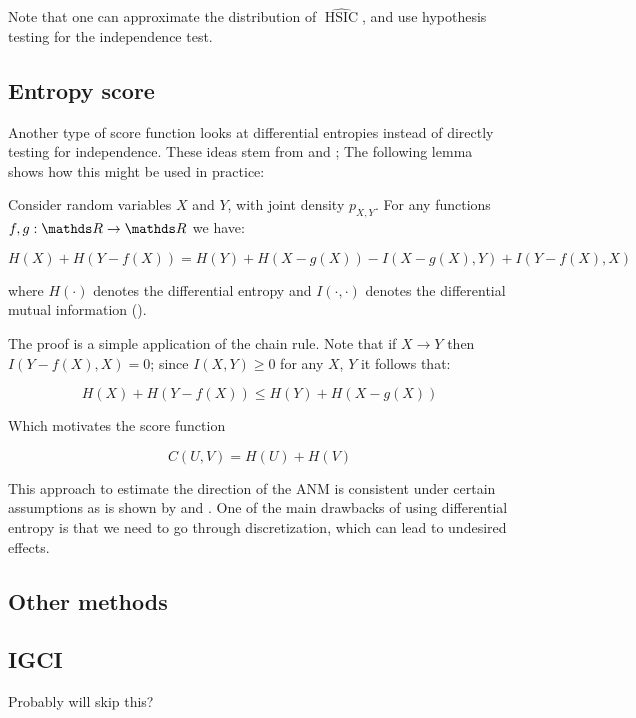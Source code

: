 Note that one can approximate the distribution of $\widehat{\operatorname{HSIC}}$, and use hypothesis testing 
for the independence test. 

\subsection{Entropy score}

Another type of score function looks at differential entropies instead of directly testing for independence.
These ideas stem from \cite{kpotufe2014consistency} and \cite{nowzohour2016score}; The following lemma shows how this might be used in practice:

\begin{lemma} Consider random variables $X$ and $Y$, with joint density $p_{X, Y}$. For any functions 
$f, g : \R \rightarrow \R$ we have:

$$
    H(X) + H(Y - f(X)) = H(Y) + H(X - g(X)) - I(X - g(X), Y) + I(Y - f(X), X)
$$

where $H(\cdot)$ denotes the differential entropy and $I(\cdot, \cdot)$ denotes the differential mutual information 
(\cite{cover1999elements}).
\end{lemma}

The proof is a simple application of the chain rule. Note that if $X \rightarrow Y$ then $I(Y - f(X), X) = 0$; 
since $I(X, Y) \geq 0$ for any $X$, $Y$ it follows
that:

$$
    H(X) + H(Y - f(X)) \leq  H(Y) + H(X - g(X))
$$

Which motivates the score function

$$
    C(U, V) = H(U) + H(V)
$$

This approach to estimate the direction of the ANM is consistent under certain assumptions as is shown by 
\cite{kpotufe2014consistency} and \cite{nowzohour2016score}. One of the main drawbacks of using differential
entropy is that we need to go through discretization, which can lead to undesired effects.


\subsection{Other methods}

\subsection{IGCI}

Probably will skip this?


